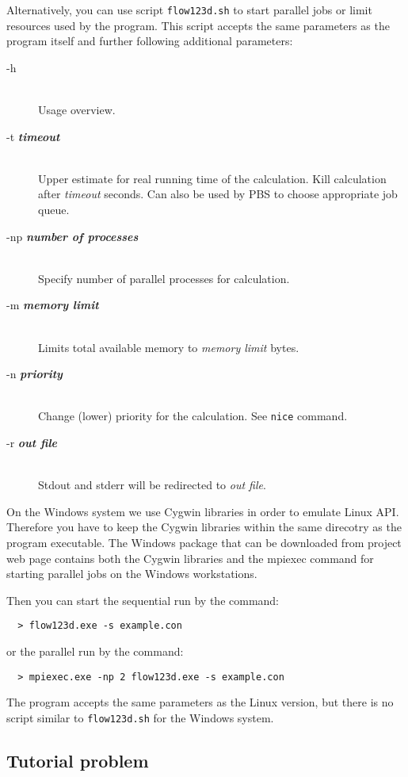 \documentclass[12pt,a4paper]{report}
\begin{document}
Alternatively, you can use script \verb'flow123d.sh' to start parallel jobs or limit resources used by the program. 
This script accepts the same parameters as the program itself
and further following additional parameters:

\begin{description}
  \item[-h] \hfill\\
  	Usage overview.
  \item[-t {\bf\it timeout}] \hfill\\
  	Upper estimate for real running time of the calculation. Kill calculation after {\it timeout} seconds. 
  	Can also be used by PBS to choose appropriate job queue. 
  \item[-np {\bf\it number of processes}] \hfill\\
  	Specify number of parallel processes for calculation.
  \item[-m {\bf\it memory limit}] \hfill\\
  	Limits total available memory to {\it memory limit} bytes.
  \item[-n {\bf\it priority}] \hfill\\
  	Change (lower) priority for the calculation. See {\tt nice} command.
  \item[-r {\bf\it out file}] \hfill\\
  	Stdout and stderr will be redirected to {\it out file}.
\end{description}

On the Windows system we use Cygwin libraries in order to emulate Linux API.
Therefore you have to keep the Cygwin libraries within the same direcotry as the program executable.
The Windows package that can be downloaded from project web page contains both the Cygwin libraries
and the mpiexec command for starting parallel jobs on the Windows workstations.

Then you can start the sequential run by the command:
\begin{verbatim}
  > flow123d.exe -s example.con
\end{verbatim}
or the parallel run by the command:
\begin{verbatim}
  > mpiexec.exe -np 2 flow123d.exe -s example.con
\end{verbatim}
The program accepts the same parameters as the Linux version, but there is no script similar to \verb'flow123d.sh' for the Windows system.


\subsection{Tutorial problem}
\end{document}
